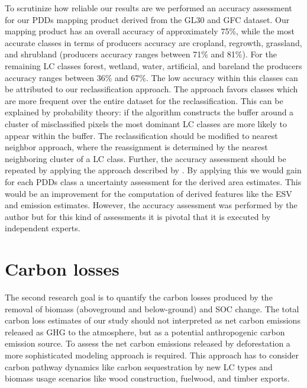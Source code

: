 		To scrutinize how reliable our results are we performed an accuracy assessment for our \acp{PDD} mapping product derived from the \ac{GL30} and \ac{GFC} dataset. Our mapping product has an overall accuracy of approximately 75\%, while the most accurate classes in terms of producers accuracy are cropland, regrowth, grassland, and shrubland (producers accuracy ranges between 71\% and 81\%). For the remaining \ac{LC} classes forest, wetland, water, artificial, and bareland the producers accuracy ranges between 36\% and 67\%. The low accuracy within this classes can be attributed to our reclassification approach. The approach favors classes which are more frequent over the entire dataset for the reclassification. This can be explained by probability theory: if the algorithm constructs the buffer around a cluster of misclassified pixels the most dominant \ac{LC} classes are more likely to appear within the buffer. The reclassification should be modified to nearest neighbor approach, where the reassignment is determined by the nearest neighboring cluster of a \ac{LC} class. Further, the accuracy assessment should be repeated by applying the approach described by \citet{Olofsson2014}. By applying this we would gain for each \acp{PDD} class a uncertainty assessment for the derived area estimates. This would be an improvement for the computation of derived features like the \ac{ESV} and emission estimates. However, the accuracy assessment was performed by the author but for this kind of assessments it is pivotal that it is executed by independent experts.

	\section{Carbon losses}
		The second research goal is to quantify the carbon losses produced by the removal of biomass (aboveground and below-ground) and \ac{SOC} change. The total carbon loss estimates of our study should not interpreted as net carbon emissions released as \ac{GHG} to the atmosphere, but as a potential anthropogenic carbon emission source. To assess the net carbon emissions released by deforestation a more sophisticated modeling approach is required. This approach has to consider carbon pathway dynamics like carbon sequestration by new \ac{LC} types and biomass usage scenarios like wood construction, fuelwood, and timber exports.

